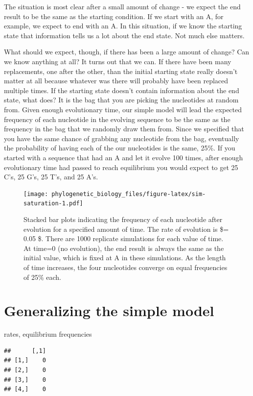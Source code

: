 \documentclass[
]{book}
\begin{document}
The situation is most clear after a small amount of change - we expect the end result to be the same as the starting condition. If we start with an A, for example, we expect to end with an A. In this situation, if we know the starting state that information tells us a lot about the end state. Not much else matters.

What should we expect, though, if there has been a large amount of change? Can we know anything at all? It turns out that we can. If there have been many replacements, one after the other, than the initial starting state really doesn't matter at all because whatever was there will probably have been replaced multiple times. If the starting state doesn't contain information about the end state, what does? It is the bag that you are picking the nucleotides at random from. Given enough evolutionary time, our simple model will lead the expected frequency of each nucleotide in the evolving sequence to be the same as the frequency in the bag that we randomly draw them from. Since we specified that you have the same chance of grabbing any nucleotide from the bag, eventually the probability of having each of the our nucleotides is the same, 25\%. If you started with a sequence that had an A and let it evolve 100 times, after enough evolutionary time had passed to reach equilibrium you would expect to get 25 C's, 25 G's, 25 T's, and 25 A's.

\begin{figure}
\centering
\texttt{[image: phylogenetic\_biology\_files/figure-latex/sim-saturation-1.pdf]}
\caption{\label{fig:sim-saturation}Stacked bar plots indicating the frequency of each nucleotide after evolution for a specified amount of time. The rate of evolution is \$\mu= 0.05 \$. There are 1000 replicate simulations for each value of time. At time=0 (no evolution), the end result is always the same as the initial value, which is fixed at A in these simulations. As the length of time increases, the four nucleotides converge on equal frequencies of 25\% each.}
\end{figure}

\hypertarget{generalizing-the-simple-model}{%
\section{Generalizing the simple model}\label{generalizing-the-simple-model}}

rates, equilibrium frequencies

\begin{verbatim}
##      [,1]
## [1,]    0
## [2,]    0
## [3,]    0
## [4,]    0
\end{verbatim}
\end{document}
